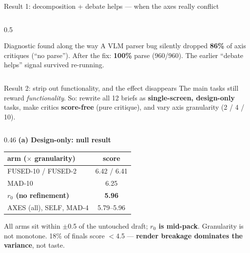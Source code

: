 \documentclass[aspectratio=169,10pt]{beamer}
\newcommand{\hl}[1]{\textbf{\color{navymain}#1}}
\newcommand{\bad}[1]{\textbf{\color{accentred}#1}}
\newcommand{\gd}[1]{\textbf{\color{winner}#1}}
\begin{document}
\begin{frame}{Result 1: decomposition + debate helps --- when the axes really conflict}
\begin{columns}[T,onlytextwidth]
\begin{column}{0.5\textwidth}
\vspace{0.5em}
\begin{block}{\scriptsize Diagnostic found along the way}
\scriptsize A VLM parser bug silently dropped \bad{86\%} of axis critiques
(``no parse''). After the fix: \gd{100\%} parse (960/960).
The earlier ``debate helps'' signal survived re-running.
\end{block}
\end{column}
\end{columns}
\end{frame}

\begin{frame}{Result 2: strip out functionality, and the effect disappears}
\scriptsize
The main tasks still reward \emph{functionality}. So: rewrite all 12 briefs as
\hl{single-screen, design-only} tasks, make critics \hl{score-free} (pure critique),
and vary axis granularity (2 / 4 / 10).

\vspace{0.35em}
\begin{columns}[T,onlytextwidth]
\begin{column}{0.46\textwidth}
\textbf{\color{navymain}(a) Design-only: null result}
\begin{center}
\begin{tabular}{@{}lc@{}}
\toprule
arm ($\times$ granularity) & score \\
\midrule
FUSED-10 / FUSED-2 & 6.42 / 6.41 \\
MAD-10             & 6.25 \\
\bad{$r_0$ (no refinement)} & \bad{5.96} \\
AXES (all), SELF, MAD-4 & 5.79--5.96 \\
\bottomrule
\end{tabular}
\end{center}
All arms sit within $\pm$0.5 of the untouched draft; \hl{$r_0$ is mid-pack}.
Granularity is not monotone. 18\% of finals score $<$4.5 --- \bad{render breakage
dominates the variance}, not taste.
\end{column}


\end{columns}
\end{frame}
\end{document}
